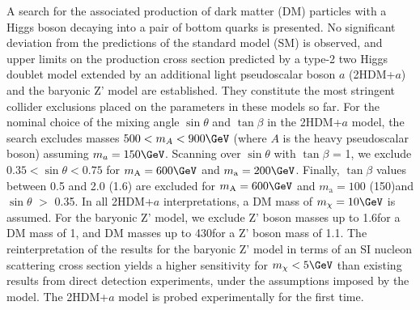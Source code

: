 A search for the associated production of dark matter (DM) particles with a Higgs
boson decaying into a pair of bottom quarks is presented. No significant
deviation from the predictions of the standard model (SM) is observed, and upper limits on
the production cross section predicted by a type-2 two Higgs doublet model
extended by an additional light pseudoscalar boson $a$ (2HDM+$a$) and the
baryonic Z' model are established. They constitute the most stringent collider exclusions placed on the parameters in these
models so far. For the nominal choice of the mixing angle $\sin\theta$
and $\tan\beta$ in the 2HDM+$a$ model, the search excludes masses
$500<m_A<900\GeV$ (where $A$ is the heavy pseudoscalar boson) assuming $m_a=150\GeV$. Scanning over
$\sin\theta$ with $\tan\beta$ = 1, we exclude
$0.35<\sin\theta<0.75$ for $m_\text{A}=600\GeV$ and
$m_\text{a}=200\GeV$.  Finally, $\tan\beta$ values between 0.5 and 2.0
(1.6) are excluded for $m_\text{A}=600\GeV$ and $m_\text{a}=100$
(150)\GeV and $\sin\theta$ $>$ 0.35. In all 2HDM+$a$ interpretations, a DM mass of $m_\chi=10\GeV$ is assumed. For the baryonic Z' model, we exclude Z' boson masses up to 1.6\TeV for a DM mass of 1\GeV, and DM masses up to 430\GeV for a Z' boson mass of 1.1\TeV. The reinterpretation of the results for the baryonic Z' model in terms of an SI nucleon scattering cross section yields a higher sensitivity for $m_\chi<5\GeV$ than existing results from direct detection experiments, under the assumptions imposed by the model. The 2HDM+$a$ model is probed experimentally for the first time.

 
